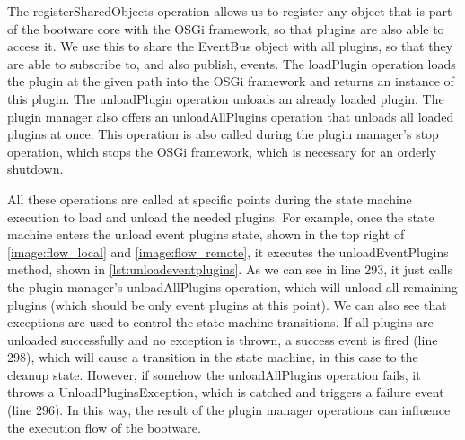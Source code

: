\vspace*{\baselineskip}

The registerSharedObjects operation allows us to register any object that is part of the bootware core with the OSGi framework, so that plugins are also able to access it.
We use this to share the EventBus object with all plugins, so that they are able to subscribe to, and also publish, events.
The loadPlugin operation loads the plugin at the given path into the OSGi framework and returns an instance of this plugin.
The unloadPlugin operation unloads an already loaded plugin.
The plugin manager also offers an unloadAllPlugins operation that unloads all loaded plugins at once.
This operation is also called during the plugin manager's stop operation, which stops the OSGi framework, which is necessary for an orderly shutdown.

All these operations are called at specific points during the state machine execution to load and unload the needed plugins.
For example, once the state machine enters the unload event plugins state, shown in the top right of \autoref{image:flow_local} and \autoref{image:flow_remote}, it executes the unloadEventPlugins method, shown in \autoref{lst:unloadeventplugins}.
As we can see in line 293, it just calls the plugin manager's unloadAllPlugins operation, which will unload all remaining plugins (which should be only event plugins at this point).
We can also see that exceptions are used to control the state machine transitions.
If all plugins are unloaded successfully and no exception is thrown, a success event is fired (line 298), which will cause a transition in the state machine, in this case to the cleanup state.
However, if somehow the unloadAllPlugins operation fails, it throws a UnloadPluginsException, which is catched and triggers a failure event (line 296).
In this way, the result of the plugin manager operations can influence the execution flow of the bootware.

\vspace*{\baselineskip}
